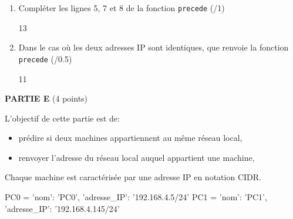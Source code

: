 \documentclass[a4paper,10pt]{report}
\begin{document}
    \begin{enumerate}[resume]
        \item Compléter les lignes 5, 7 et 8 de la fonction \verb|precede| (/1)
                \begin{answer}{1}{3}    \end{answer}

        \item Dans le cas où les deux adresses IP sont identiques, que renvoie la fonction \verb|precede| (/0.5)
                \begin{answer}{1}{1}    \end{answer}

  \end{enumerate}

  \medskip


\pagebreak

\textbf{PARTIE E} \dotfill (4 points)

\medskip

L'objectif de cette partie est de:
\begin{itemize}
    \item prédire si deux machines appartiennent au même réseau local,
    \item renvoyer l'adresse du réseau local auquel appartient une machine,
    

\end{itemize}

Chaque machine est caractérisée par une adresse IP en notation CIDR.

\begin{CodePythontexAlt}[TaillePolice=\large, Largeur=1\linewidth,Centre,Lignes=true,PremLigne=1]{}
PC0 = {'nom': 'PC0', 'adresse_IP': '192.168.4.5/24'}
PC1 = {'nom': 'PC1', 'adresse_IP': '192.168.4.145/24'}
   \end{CodePythontexAlt}
\end{document}
